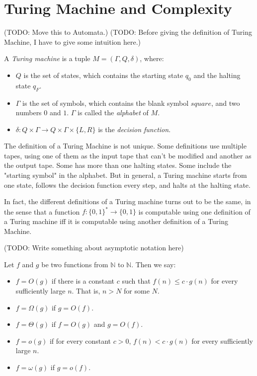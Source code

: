
\newcommand{\zo}{\{0,1\}}
\newcommand{\strs}{\{0,1\}^\ast}


    \section{Turing Machine and Complexity}
        (TODO: Move this to Automata.) (TODO: Before giving the definition of Turing Machine, I have to give some intuition here.)
        \begin{defn} \label{def_tm}
            A \emph{Turing machine} is a tuple $M=(\Gamma,Q,\delta)$, where: \begin{itemize}
                \item $Q$ is the set of states, which contains the starting state $q_0$ and the halting state $q_F$.
                \item $\Gamma$ is the set of symbols, which contains the blank symbol $square$, and two numbers $0$ and $1$. $\Gamma$ is called the \emph{alphabet} of $M$.
                \item $\delta:Q \times \Gamma \rightarrow Q \times \Gamma \times \{L,R\}$ is the \emph{decision function}.
            \end{itemize}
        \end{defn}
        
        The definition of a Turing Machine is not unique. Some definitions use multiple tapes, using one of them as the input tape that can't be modified and another as the output tape. Some has more than one halting states. Some include the "starting symbol" in the alphabet. But in general, a Turing machine starts from one state, follows the decision function every step, and halts at the halting state.
        
        In fact, the different definitions of a Turing machine turns out to be the same, in the sense that a function $f:\strs \rightarrow \zo$ is computable using one definition of a Turing machine iff it is computable using another definition of a Turing Machine.
        
        (TODO: Write something about asymptotic notation here)
        
        \begin{defn} \label{def_bigo}
            Let $f$ and $g$ be two functions from $\mathbb{N}$ to $\mathbb{N}$. Then we say: \begin{itemize}
                \item $f=O(g)$ if there is a constant $c$ such that $f(n) \leq c \cdot g(n)$ for every sufficiently large $n$. That is, $n>N$ for some $N$.
                \item $f=\Omega(g)$ if $g=O(f)$.
                \item $f=\Theta(g)$ if $f=O(g)$ and $g=O(f)$.
                \item $f=o(g)$ if for every constant $c>0$, $f(n) < c \cdot g(n)$ for every sufficiently large $n$.
                \item $f=\omega(g)$ if $g=o(f)$.
            \end{itemize} 
        \end{defn}
        
